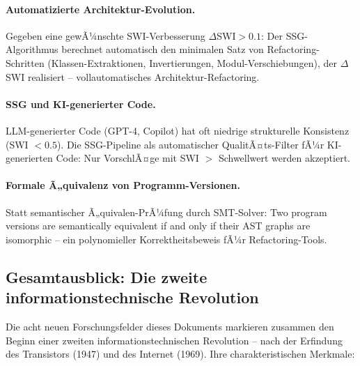 ﻿\documentclass[a4paper,12pt]{scrreprt}
\theoremstyle{definition}
\begin{document}
\paragraph{Automatizierte Architektur-Evolution.}
Gegeben eine gewÃ¼nschte SWI-Verbesserung $\Delta$SWI${} > 0.1$:
Der SSG-Algorithmus berechnet automatisch den minimalen Satz von
Refactoring-Schritten (Klassen-Extraktionen, Invertierungen,
Modul-Verschiebungen), der $\Delta$SWI realisiert -- vollautomatisches
Architektur-Refactoring.

\paragraph{SSG und KI-generierter Code.}
LLM-generierter Code (GPT-4, Copilot) hat oft niedrige strukturelle
Konsistenz (SWI $< 0.5$). Die SSG-Pipeline als automatischer
QualitÃ¤ts-Filter fÃ¼r KI-generierten Code: Nur VorschlÃ¤ge mit
SWI $>$ Schwellwert werden akzeptiert.

\paragraph{Formale Ã„quivalenz von Programm-Versionen.}
Statt semantischer Ã„quivalen-PrÃ¼fung durch SMT-Solver:
Two program versions are semantically equivalent if and only if
their AST graphs are isomorphic -- ein polynomieller Korrektheitsbeweis
fÃ¼r Refactoring-Tools.

\subsection*{Gesamtausblick: Die zweite informationstechnische Revolution}

Die acht neuen Forschungsfelder dieses Dokuments markieren zusammen
den Beginn einer zweiten informationstechnischen Revolution -- nach
der Erfindung des Transistors (1947) und des Internet (1969). Ihre
charakteristischen Merkmale:
\end{document}
